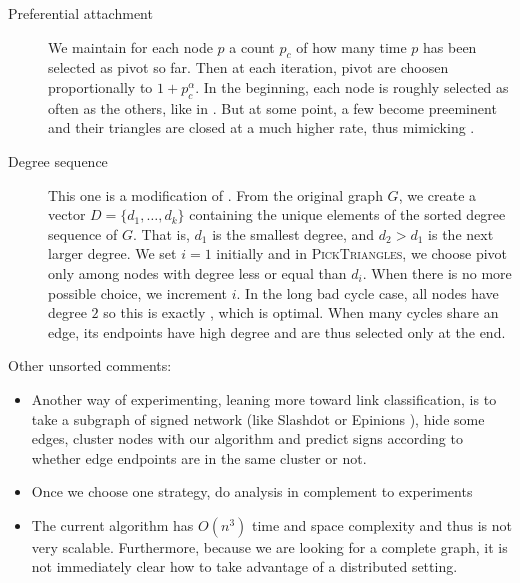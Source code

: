 \begin{description}
	\item[Preferential attachment] We maintain for each node $p$ a count
		$p_c$ of how many time $p$ has been selected as pivot so far. Then at
		each iteration, pivot are choosen proportionally to $1+p_c^\alpha$.
		In the beginning, each node is roughly selected as often as the
		others, like in \pot{}. But at some point, a few become preeminent
		and their triangles are closed at a much higher rate, thus
		mimicking \pat{}.
	\item[Degree sequence] This one is a modification of \pat{}. From the
		original graph $G$, we create a vector $D=\{d_1, \ldots, d_k\}$
		containing the unique elements of the sorted degree sequence of $G$. That is,
		$d_1$ is the smallest degree, and $d_2 > d_1$ is the next larger  degree.
	We set $i=1$ initially and in \textsc{PickTriangles}, we choose pivot
	only among nodes with degree less or equal than $d_i$. When there is no more
	possible choice, we increment $i$. In the long bad cycle case, all nodes
	have degree $2$ so this is exactly \pat{}, which is optimal. When many
	cycles share an edge, its endpoints have high degree and are thus
	selected only at the end.
\end{description}

Other unsorted comments:
\begin{itemize}
	\item Another way of experimenting, leaning more toward link classification,
		is to take a subgraph of signed network (like Slashdot or Epinions
		\autocite{Leskovec2010}), hide some edges, cluster nodes with our
		algorithm and predict signs according to whether edge endpoints are in
		the same cluster or not.
	\item Once we choose one strategy, do analysis in complement to
		experiments
	\item The current algorithm has $O(n^3)$ time and space complexity and
		thus is not very scalable. Furthermore, because we are looking for a
		complete graph, it is not immediately clear how to take advantage of a
		distributed setting.
\end{itemize}

